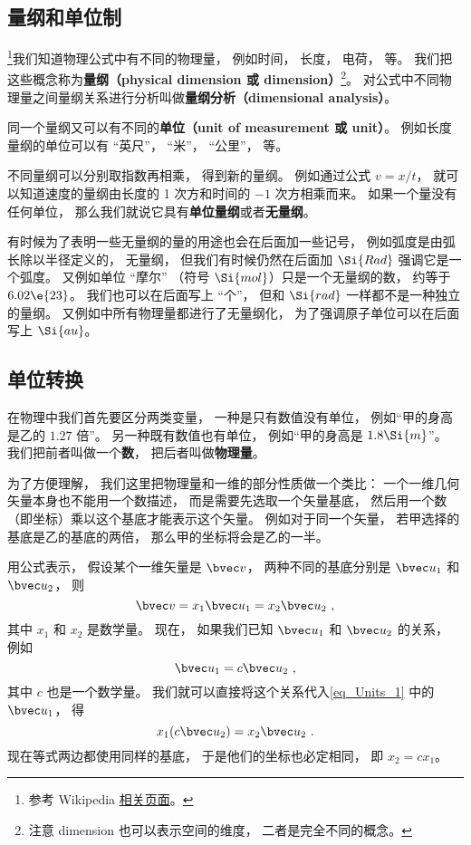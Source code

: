 
\subsection{量纲和单位制}
\footnote{参考 Wikipedia \href{https://en.wikipedia.org/wiki/Dimensional_analysis}{相关页面}。}我们知道物理公式中有不同的物理量， 例如时间， 长度， 电荷， 等。 我们把这些概念称为\textbf{量纲（physical dimension 或 dimension）}\footnote{注意 dimension 也可以表示空间的维度， 二者是完全不同的概念。}。 对公式中不同物理量之间量纲关系进行分析叫做\textbf{量纲分析（dimensional analysis）}。

同一个量纲又可以有不同的\textbf{单位（unit of measurement 或 unit）}。 例如长度量纲的单位可以有 “英尺”， “米”， “公里”， 等。

不同量纲可以分别取指数再相乘， 得到新的量纲。 例如通过公式 $v = x/t$， 就可以知道速度的量纲由长度的 1 次方和时间的 $-1$ 次方相乘而来。 如果一个量没有任何单位， 那么我们就说它具有\textbf{单位量纲}或者\textbf{无量纲}。

有时候为了表明一些无量纲的量的用途也会在后面加一些记号， 例如弧度是由弧长除以半径定义的， 无量纲， 但我们有时候仍然在后面加 $\Si{Rad}$ 强调它是一个弧度。 又例如单位 “摩尔” （符号 $\Si{mol}$）只是一个无量纲的数， 约等于 $6.02\e{23}$。 我们也可以在后面写上 “个”， 但和 $\Si{rad}$ 一样都不是一种独立的量纲。 又例如中所有物理量都进行了无量纲化， 为了强调原子单位可以在后面写上 $\Si{au}$。

\subsection{单位转换}


在物理中我们首先要区分两类变量， 一种是只有数值没有单位， 例如“甲的身高是乙的 $1.27$ 倍”。 另一种既有数值也有单位， 例如“甲的身高是 $1.8\Si{m}$”。 我们把前者叫做一个\textbf{数}， 把后者叫做\textbf{物理量}。

为了方便理解， 我们这里把物理量和一维的部分性质做一个类比： 一个一维几何矢量本身也不能用一个数描述， 而是需要先选取一个矢量基底， 然后用一个数（即坐标）乘以这个基底才能表示这个矢量。 例如对于同一个矢量， 若甲选择的基底是乙的基底的两倍， 那么甲的坐标将会是乙的一半。

用公式表示， 假设某个一维矢量是 $\bvec v$， 两种不同的基底分别是 $\bvec u_1$ 和 $\bvec u_2$， 则
\begin{equation}\label{eq_Units_1}
\bvec v = x_1 \bvec u_1 = x_2 \bvec u_2~,
\end{equation}
其中 $x_1$ 和 $x_2$ 是数学量。 现在， 如果我们已知 $\bvec u_1$ 和 $\bvec u_2$ 的关系， 例如
\begin{equation}\label{eq_Units_2}
\bvec u_1 = c \bvec u_2~,
\end{equation}
其中 $c$ 也是一个数学量。 我们就可以直接将这个关系代入\autoref{eq_Units_1} 中的 $\bvec u_1$， 得
\begin{equation}
x_1 (c \bvec u_2) = x_2 \bvec u_2~.
\end{equation}
现在等式两边都使用同样的基底， 于是他们的坐标也必定相同， 即 $x_2 = c x_1$。


